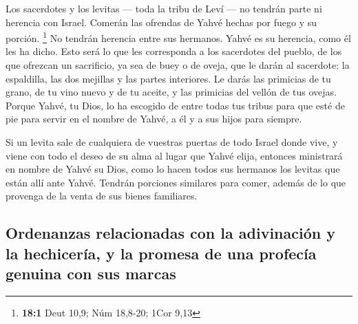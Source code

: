 \begin{paracol}{2}
 Los sacerdotes y los levitas --- toda la tribu de Leví
--- no tendrán parte ni herencia con Israel. Comerán las ofrendas de
Yahvé hechas por fuego y su porción. \footnote{\textbf{18:1} Deut 10,9;
  Núm 18,8-20; 1Cor 9,13}  No tendrán herencia entre sus
hermanos. Yahvé es su herencia, como él les ha dicho. 
Esto será lo que les corresponda a los sacerdotes del pueblo, de los que
ofrezcan un sacrificio, ya sea de buey o de oveja, que le darán al
sacerdote: la espaldilla, las dos mejillas y las partes interiores.
 Le darás las primicias de tu grano, de tu vino nuevo y de
tu aceite, y las primicias del vellón de tus ovejas. 
Porque Yahvé, tu Dios, lo ha escogido de entre todas tus tribus para que
esté de pie para servir en el nombre de Yahvé, a él y a sus hijos para
siempre.

 Si un levita sale de cualquiera de vuestras puertas de
todo Israel donde vive, y viene con todo el deseo de su alma al lugar
que Yahvé elija,  entonces ministrará en nombre de Yahvé
su Dios, como lo hacen todos sus hermanos los levitas que están allí
ante Yahvé.  Tendrán porciones similares para comer,
además de lo que provenga de la venta de sus bienes familiares.

\hypertarget{ordenanzas-relacionadas-con-la-adivinaciuxf3n-y-la-hechiceruxeda-y-la-promesa-de-una-profecuxeda-genuina-con-sus-marcas}{%
\subsection{Ordenanzas relacionadas con la adivinación y la hechicería,
y la promesa de una profecía genuina con sus
marcas}\label{ordenanzas-relacionadas-con-la-adivinaciuxf3n-y-la-hechiceruxeda-y-la-promesa-de-una-profecuxeda-genuina-con-sus-marcas}}


\end{paracol}
